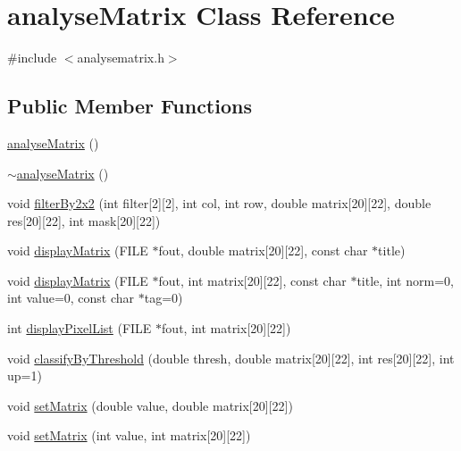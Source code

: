\hypertarget{classanalyseMatrix}{\section{analyse\-Matrix Class Reference}
\label{classanalyseMatrix}
}


{\ttfamily \#include $<$analysematrix.\-h$>$}

\subsection*{Public Member Functions}
\begin{DoxyCompactItemize}
\item 
\hyperlink{classanalyseMatrix_ae056d1b34e217c935a4353255ebdd9bb}{analyse\-Matrix} ()
\item 
\hyperlink{classanalyseMatrix_ab0bad30e89e799510fbb95a5b9d37ab8}{$\sim$analyse\-Matrix} ()
\item 
void \hyperlink{classanalyseMatrix_a39fd86f43c32f0803d8e05859e96afaa}{filter\-By2x2} (int filter\mbox{[}2\mbox{]}\mbox{[}2\mbox{]}, int col, int row, double matrix\mbox{[}20\mbox{]}\mbox{[}22\mbox{]}, double res\mbox{[}20\mbox{]}\mbox{[}22\mbox{]}, int mask\mbox{[}20\mbox{]}\mbox{[}22\mbox{]})
\item 
void \hyperlink{classanalyseMatrix_af376bbf6f497ebe891aa1670072008a9}{display\-Matrix} (F\-I\-L\-E $\ast$fout, double matrix\mbox{[}20\mbox{]}\mbox{[}22\mbox{]}, const char $\ast$title)
\item 
void \hyperlink{classanalyseMatrix_a455fced75f8847d2749111da7e7fd44a}{display\-Matrix} (F\-I\-L\-E $\ast$fout, int matrix\mbox{[}20\mbox{]}\mbox{[}22\mbox{]}, const char $\ast$title, int norm=0, int value=0, const char $\ast$tag=0)
\item 
int \hyperlink{classanalyseMatrix_a7f26b3aefa10cb9457c3dd3d2334420d}{display\-Pixel\-List} (F\-I\-L\-E $\ast$fout, int matrix\mbox{[}20\mbox{]}\mbox{[}22\mbox{]})
\item 
void \hyperlink{classanalyseMatrix_a6ff734ef0f617117e1dd9235646edc1a}{classify\-By\-Threshold} (double thresh, double matrix\mbox{[}20\mbox{]}\mbox{[}22\mbox{]}, int res\mbox{[}20\mbox{]}\mbox{[}22\mbox{]}, int up=1)
\item 
void \hyperlink{classanalyseMatrix_a16bc8177a6cfbf2bc8877c4bfa890ef3}{set\-Matrix} (double value, double matrix\mbox{[}20\mbox{]}\mbox{[}22\mbox{]})
\item 
void \hyperlink{classanalyseMatrix_acbcd251fd377f28de7ca6a1381b519cf}{set\-Matrix} (int value, int matrix\mbox{[}20\mbox{]}\mbox{[}22\mbox{]})

\end{DoxyCompactItemize}
